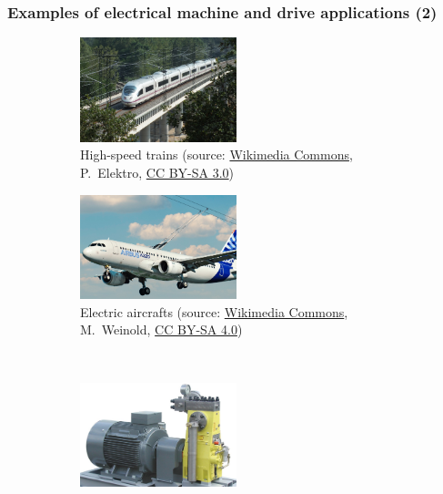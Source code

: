 \begin{frame}
	\frametitle{Examples of electrical machine and drive applications (2)}
	\begin{figure}
		\ContinuedFloat
		\centering
		\begin{subfigure}[b]{0.49\textwidth}
			\centering
			\includegraphics[width=0.5\textwidth]{fig/lec01/Train.jpg}
			\caption{High-speed trains (source: \href{https://commons.wikimedia.org/wiki/File:Fast_Train_Spain_Class_103_AVE_Siemens_Bridge_Macanet-Massanes.JPG}{Wikimedia Commons}, P.~Elektro, \href{https://creativecommons.org/licenses/by-sa/3.0/deed.en}{CC BY-SA 3.0})}
		\end{subfigure}
		\hfill
		\begin{subfigure}[b]{0.49\textwidth}
			\centering
			\includegraphics[width=0.5\textwidth]{fig/lec01/Electric_Airbus_A320.jpg}
			\caption{Electric aircrafts (source: \href{https://commons.wikimedia.org/wiki/File:Electric_Airbus_A320.jpg}{Wikimedia Commons}, M.~Weinold, \href{https://creativecommons.org/licenses/by-sa/4.0/deed.en}{CC BY-SA 4.0})}
		\end{subfigure}
		\\
		\begin{subfigure}[b]{0.49\textwidth}
			\centering
			\includegraphics[width=0.5\textwidth]{fig/lec01/Pump.jpg}

\end{subfigure}
\end{figure}
\end{frame}
